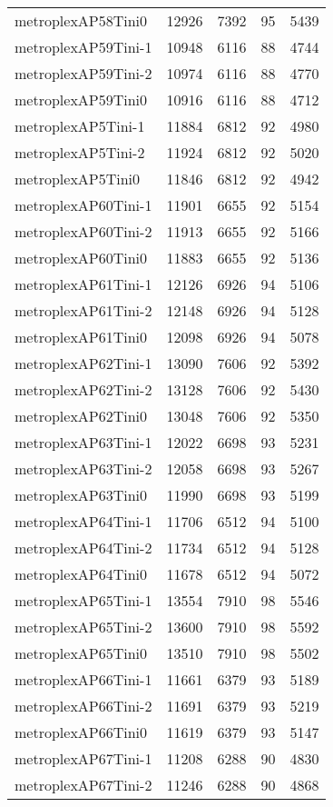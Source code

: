 \begin{longtable}{lrrrr}
metroplexAP58Tini0 & 12926 & 7392 & 95 & 5439 \\
metroplexAP59Tini-1 & 10948 & 6116 & 88 & 4744 \\
metroplexAP59Tini-2 & 10974 & 6116 & 88 & 4770 \\
metroplexAP59Tini0 & 10916 & 6116 & 88 & 4712 \\
metroplexAP5Tini-1 & 11884 & 6812 & 92 & 4980 \\
metroplexAP5Tini-2 & 11924 & 6812 & 92 & 5020 \\
metroplexAP5Tini0 & 11846 & 6812 & 92 & 4942 \\
metroplexAP60Tini-1 & 11901 & 6655 & 92 & 5154 \\
metroplexAP60Tini-2 & 11913 & 6655 & 92 & 5166 \\
metroplexAP60Tini0 & 11883 & 6655 & 92 & 5136 \\
metroplexAP61Tini-1 & 12126 & 6926 & 94 & 5106 \\
metroplexAP61Tini-2 & 12148 & 6926 & 94 & 5128 \\
metroplexAP61Tini0 & 12098 & 6926 & 94 & 5078 \\
metroplexAP62Tini-1 & 13090 & 7606 & 92 & 5392 \\
metroplexAP62Tini-2 & 13128 & 7606 & 92 & 5430 \\
metroplexAP62Tini0 & 13048 & 7606 & 92 & 5350 \\
metroplexAP63Tini-1 & 12022 & 6698 & 93 & 5231 \\
metroplexAP63Tini-2 & 12058 & 6698 & 93 & 5267 \\
metroplexAP63Tini0 & 11990 & 6698 & 93 & 5199 \\
metroplexAP64Tini-1 & 11706 & 6512 & 94 & 5100 \\
metroplexAP64Tini-2 & 11734 & 6512 & 94 & 5128 \\
metroplexAP64Tini0 & 11678 & 6512 & 94 & 5072 \\
metroplexAP65Tini-1 & 13554 & 7910 & 98 & 5546 \\
metroplexAP65Tini-2 & 13600 & 7910 & 98 & 5592 \\
metroplexAP65Tini0 & 13510 & 7910 & 98 & 5502 \\
metroplexAP66Tini-1 & 11661 & 6379 & 93 & 5189 \\
metroplexAP66Tini-2 & 11691 & 6379 & 93 & 5219 \\
metroplexAP66Tini0 & 11619 & 6379 & 93 & 5147 \\
metroplexAP67Tini-1 & 11208 & 6288 & 90 & 4830 \\
metroplexAP67Tini-2 & 11246 & 6288 & 90 & 4868 \\

\end{longtable}
